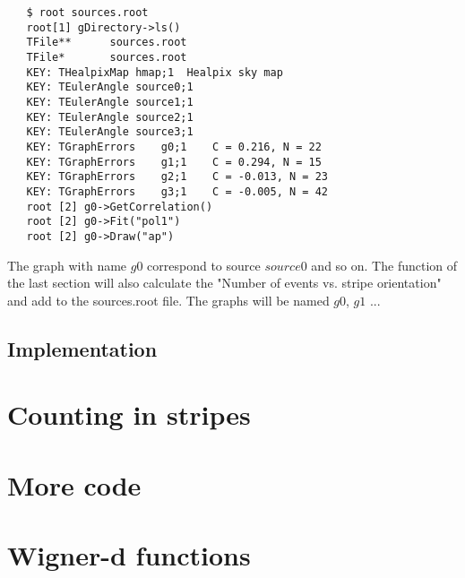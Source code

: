 \documentclass[12pt]{article}
\begin{document}
{ \color{brown}
   \begin{lstlisting}
   $ root sources.root
   root[1] gDirectory->ls()
   TFile**		sources.root	
   TFile*		sources.root	
   KEY: THealpixMap	hmap;1	Healpix sky map
   KEY: TEulerAngle	source0;1	
   KEY: TEulerAngle	source1;1	
   KEY: TEulerAngle	source2;1	
   KEY: TEulerAngle	source3;1	
   KEY: TGraphErrors	g0;1	C = 0.216, N = 22
   KEY: TGraphErrors	g1;1	C = 0.294, N = 15
   KEY: TGraphErrors	g2;1	C = -0.013, N = 23
   KEY: TGraphErrors	g3;1	C = -0.005, N = 42
   root [2] g0->GetCorrelation()
   root [2] g0->Fit("pol1")
   root [2] g0->Draw("ap")
   \end{lstlisting}
}

The graph with name $g0$ correspond to source $source0$ and so on.
The function of the last section will also calculate the "Number of events vs. stripe orientation"
and add to the sources.root file. The graphs will be named $g0$, $g1$ ...

\subsection{Implementation}
\section{Counting in stripes} \label{ch::raios-cosmicos}


\section{More code}
\section{Wigner-d functions}
\appendix
\end{document}
